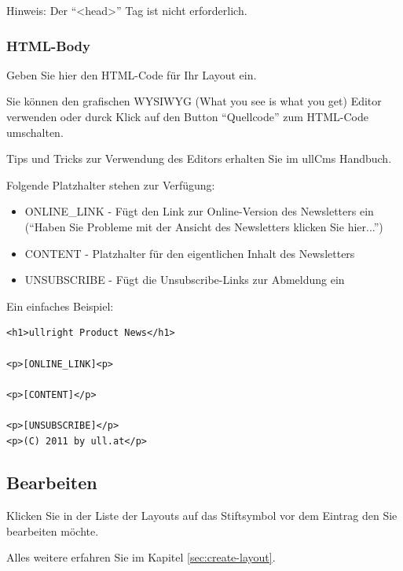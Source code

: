 \documentclass[article, a4paper, oneside, 11pt]{memoir}
\begin{document}
Hinweis: Der "`<head>"' Tag ist nicht erforderlich.

\subsubsection{HTML-Body}

Geben Sie hier den HTML-Code für Ihr Layout ein.

Sie können den grafischen WYSIWYG (What you see is what you get) Editor verwenden oder durck Klick auf den Button "`Quellcode"' zum HTML-Code umschalten.

Tips und Tricks zur Verwendung des Editors erhalten Sie im ullCms Handbuch.


Folgende Platzhalter stehen zur Verfügung:

\begin{itemize}
 \item \lbrack ONLINE\_LINK \rbrack  - Fügt den Link zur Online-Version des Newsletters ein ("`Haben Sie Probleme mit der Ansicht des Newsletters klicken Sie hier..."')
 \item \lbrack CONTENT \rbrack  - Platzhalter für den eigentlichen Inhalt des Newsletters
 \item \lbrack UNSUBSCRIBE \rbrack   - Fügt die Unsubscribe-Links zur Abmeldung ein
\end{itemize}

Ein einfaches Beispiel:

\begin{lstlisting}
<h1>ullright Product News</h1>

<p>[ONLINE_LINK]<p>

<p>[CONTENT]</p>

<p>[UNSUBSCRIBE]</p>
<p>(C) 2011 by ull.at</p>
\end{lstlisting}

\subsection{Bearbeiten}

Klicken Sie in der Liste der Layouts auf das Stiftsymbol vor dem Eintrag den Sie bearbeiten möchte.

Alles weitere erfahren Sie im Kapitel \vref{sec:create-layout}.
\end{document}

